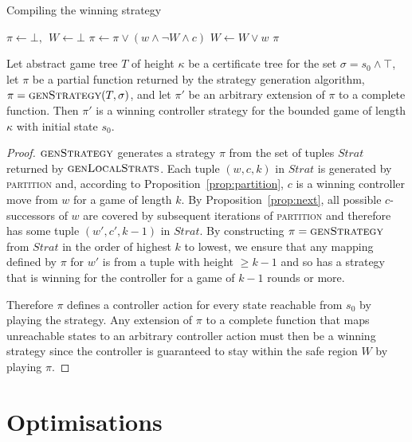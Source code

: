 \begin{algorithm}[t]
   \caption{Compiling the  winning strategy}\label{alg:compile}
   \begin{algorithmic}[1]
            \State $\pi \gets \bot,~~W \gets \bot$
             
            \State $\pi \gets \pi \lor (w \land \neg W \land c)$
                \State $W \gets W \lor w$
            \EndFor
            \State \Return $\pi$
        \EndFunction
    \end{algorithmic}
\end{algorithm}

\begin{theorem}\label{th:stratCorrectness}
Let abstract game tree $T$ of height $\kappa$ be a certificate tree for the set $\sigma = s_0 \land \top$, let $\pi$ be a partial function returned by the strategy generation algorithm, $\pi=\textsc{genStrategy}(T,\sigma)$, and let $\pi'$ be an arbitrary extension of $\pi$ to a complete function.  Then $\pi'$ is a winning controller strategy for the bounded game of length $\kappa$ with initial state $s_0$.
\end{theorem}
\begin{proof}
    $\textsc{genStrategy}$ generates a strategy $\pi$ from the set of tuples $Strat$ returned by $\textsc{genLocalStrats}$. Each tuple $(w, c, k)$ in $Strat$ is generated by \textsc{partition} and, according to Proposition~\ref{prop:partition}, $c$ is a winning controller move from $w$ for a game of length $k$. By Proposition~\ref{prop:next}, all possible $c$-successors of $w$ are covered by subsequent iterations of \textsc{partition} and therefore has some tuple $(w', c', k-1)$ in $Strat$. By constructing $\pi = \textsc{genStrategy}$ from $Strat$ in the order of highest $k$ to lowest, we ensure that any mapping defined by $\pi$ for $w'$ is from a tuple with height $\geq k-1$ and so has a strategy that is winning for the controller for a game of $k-1$ rounds or more.  
    
    Therefore $\pi$ defines a controller action for every state reachable from $s_0$ by playing the strategy. Any extension of $\pi$ to a complete function that maps unreachable states to an arbitrary controller action must then be a winning strategy since the controller is guaranteed to stay within the safe region $W$ by playing $\pi$.
\end{proof}

\section{Optimisations}

